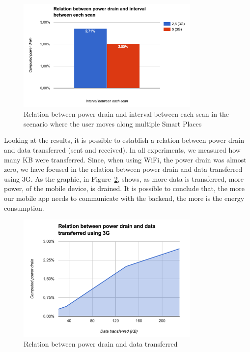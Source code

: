 

\begin{figure}[!ht]
  \centering
    \includegraphics[width=0.8\textwidth, keepaspectratio]{images/results_battery_walking}
    \caption[Power drain when the user is moving]{Relation between power drain and interval between each scan in the scenario where the user moves along multiple Smart Places}
    \label{fig:results_battery_walking}
\end{figure}

Looking at the results, it is possible to establish a relation between power drain and data transferred (sent and received).
In all experiments, we measured how many \gls{KB} were transferred.
Since, when using \gls{WiFi}, the power drain was almost zero, we have focused in the relation between power drain and data transferred using \gls{3G}.
As the graphic, in Figure~\ref{fig:results_battery_data}, shows, as more data is transferred, more power, of the mobile device, is drained.
It is possible to conclude that, the more our mobile app needs to communicate with the backend, the more is the energy consumption.

\begin{figure}[!ht]
  \centering
    \includegraphics[width=0.8\textwidth, keepaspectratio]{images/results_battery_data}
    \caption[Power drain vs Data transferred]{Relation between power drain and data transferred}
    \label{fig:results_battery_data}
\end{figure}

